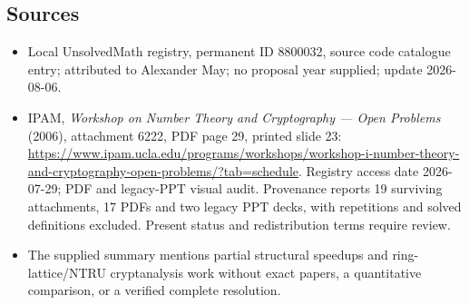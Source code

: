 \documentclass[11pt]{article}
\begin{document}
\subsection{Sources}
\begin{itemize}
\item Local UnsolvedMath registry, permanent ID 8800032, source code catalogue entry; attributed to Alexander May; no proposal year supplied; update 2026-08-06.
\item IPAM, \emph{Workshop on Number Theory and Cryptography --- Open Problems} (2006), attachment 6222, PDF page 29, printed slide 23: \url{https://www.ipam.ucla.edu/programs/workshops/workshop-i-number-theory-and-cryptography-open-problems/?tab=schedule}. Registry access date 2026-07-29; PDF and legacy-PPT visual audit. Provenance reports 19 surviving attachments, 17 PDFs and two legacy PPT decks, with repetitions and solved definitions excluded. Present status and redistribution terms require review.
\item The supplied summary mentions partial structural speedups and ring-lattice/NTRU cryptanalysis work without exact papers, a quantitative comparison, or a verified complete resolution.
\end{itemize}
\end{document}
